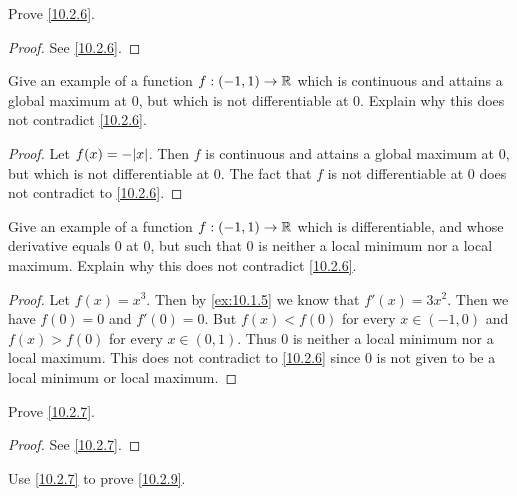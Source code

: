 \exercisesection

\begin{ex}\label{ex:10.2.1}
  Prove \cref{10.2.6}.
\end{ex}

\begin{proof}
  See \cref{10.2.6}.
\end{proof}

\begin{ex}\label{ex:10.2.2}
  Give an example of a function \(f : (-1, 1) \to \mathbb{R}\) which is continuous and attains a global maximum at \(0\), but which is not differentiable at \(0\).
  Explain why this does not contradict \cref{10.2.6}.
\end{ex}

\begin{proof}
  Let \(f(x) = -\abs{x}\).
  Then \(f\) is continuous and attains a global maximum at \(0\), but which is not differentiable at \(0\).
  The fact that \(f\) is not differentiable at \(0\) does not contradict to \cref{10.2.6}.
\end{proof}

\begin{ex}\label{ex:10.2.3}
  Give an example of a function \(f : (-1, 1) \to \mathbb{R}\) which is differentiable, and whose derivative equals \(0\) at \(0\), but such that \(0\) is neither a local minimum nor a local maximum.
  Explain why this does not contradict \cref{10.2.6}.
\end{ex}

\begin{proof}
  Let \(f(x) = x^3\).
  Then by \cref{ex:10.1.5} we know that \(f'(x) = 3x^2\).
  Then we have \(f(0) = 0\) and \(f'(0) = 0\).
  But \(f(x) < f(0)\) for every \(x \in (-1, 0)\) and \(f(x) > f(0)\) for every \(x \in (0, 1)\).
  Thus \(0\) is neither a local minimum nor a local maximum.
  This does not contradict to \cref{10.2.6} since \(0\) is not given to be a local minimum or local maximum.
\end{proof}

\begin{ex}\label{ex:10.2.4}
  Prove \cref{10.2.7}.
\end{ex}

\begin{proof}
  See \cref{10.2.7}.
\end{proof}

\begin{ex}\label{ex:10.2.5}
  Use \cref{10.2.7} to prove \cref{10.2.9}.
\end{ex}


